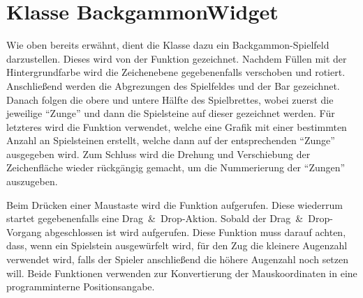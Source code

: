 \section{Klasse BackgammonWidget}
Wie oben bereits erwähnt, dient die Klasse  dazu ein Backgammon-Spielfeld darzustellen. Dieses wird von der Funktion  gezeichnet. Nachdem Füllen mit der Hintergrundfarbe wird die Zeichenebene gegebenenfalls verschoben und rotiert. Anschließend werden die Abgrezungen des Spielfeldes und der Bar gezeichnet. Danach folgen die obere und untere Hälfte des Spielbrettes, wobei zuerst die jeweilige "`Zunge"' und dann die Spielsteine auf dieser gezeichnet werden. Für letzteres wird die Funktion  verwendet, welche eine Grafik mit einer bestimmten Anzahl an Spielsteinen erstellt, welche dann auf der entsprechenden "`Zunge"' ausgegeben wird. Zum Schluss wird die Drehung und Verschiebung der Zeichenfläche wieder rückgängig gemacht, um die Nummerierung der "`Zungen"' auszugeben.

Beim Drücken einer Maustaste wird die Funktion  aufgerufen. Diese wiederrum startet gegebenenfalls eine Drag~\&~Drop-Aktion. Sobald der Drag~\&~Drop-Vorgang abgeschlossen ist wird  aufgerufen. Diese Funktion muss darauf achten, dass, wenn ein Spielstein ausgewürfelt wird, für den Zug die kleinere Augenzahl verwendet wird, falls der Spieler anschließend die höhere Augenzahl noch setzen will. Beide Funktionen verwenden  zur Konvertierung der Mauskoordinaten in eine programminterne Positionsangabe.

